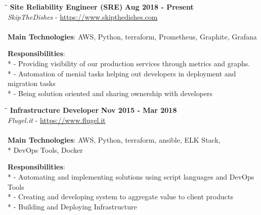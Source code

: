 \documentclass[margin]{res}
\begin{document}
\begin{resume}
\vspace{-0.1in}
\begin{tabbing}
  \hspace{2.3in}\= \hspace{1.7in}\= \kill %
  \textbf{Site Reliability Engineer (SRE)}    \>\>\textbf{Aug 2018 - Present}\\
  \textit{SkipTheDishes} - \url{https://www.skipthedishes.com}\\\\
  \textbf{Main Technologies}: AWS, Python, terraform, Prometheus, Graphite, Grafana
\end{tabbing}\vspace{-20pt}      %
\vspace{2mm}\textbf{Responsibilities}: \\*
  - Providing visibility of our production services through metrics and graphs. \\*
  - Automation of menial tasks helping out developers in deployment and migration tasks \\*
  - Being solution oriented and sharing ownership with developers \\

\vspace{-0.1in}
\begin{tabbing}
  \hspace{2.3in}\= \hspace{1.7in}\= \kill %
  \textbf{Infrastructure Developer}    \>\>\textbf{Nov 2015 - Mar 2018}\\
  \textit{Flugel.it} - \url{https://www.flugel.it}\\\\
  \textbf{Main Technologies}: AWS, Python, terraform, ansible, ELK Stack,\\*
  DevOps Tools, Docker
\end{tabbing}\vspace{-20pt}      %
\vspace{2mm}\textbf{Responsibilities}: \\*
  - Automating and implementing solutions using script languages and DevOps Tools \\*
  - Creating and developing system to aggregate value to client products \\*
  - Building and Deploying Infrastructure\\


\end{resume}
\end{document}
